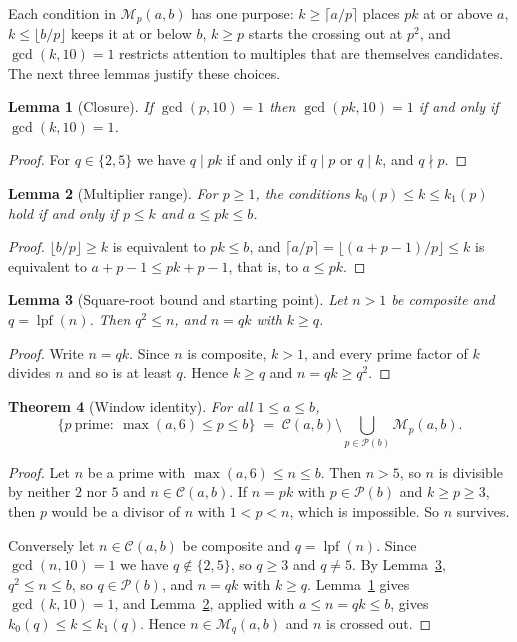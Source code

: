 \documentclass[11pt]{amsart}
\newtheorem{theorem}{Theorem}[section]
\newtheorem{lemma}[theorem]{Lemma}
\theoremstyle{definition}
\theoremstyle{remark}
\newcommand{\Cand}{\mathcal{C}}
\newcommand{\Sv}{\mathcal{P}}
\newcommand{\Mult}{\mathcal{M}}
\newcommand{\lpf}{\operatorname{lpf}}
\begin{document}
Each condition in $\Mult_p(a,b)$ has one purpose: $k\ge\lceil a/p\rceil$ places $pk$ at or above $a$, $k\le\lfloor b/p\rfloor$ keeps it at or below $b$, $k\ge p$ starts the crossing out at $p^2$, and $\gcd(k,10)=1$ restricts attention to multiples that are themselves candidates. The next three lemmas justify these choices.

\begin{lemma}[Closure]\label{lem:closure}
If $\gcd(p,10)=1$ then $\gcd(pk,10)=1$ if and only if $\gcd(k,10)=1$.
\end{lemma}

\begin{proof}
For $q\in\{2,5\}$ we have $q\mid pk$ if and only if $q\mid p$ or $q\mid k$, and $q\nmid p$.
\end{proof}

\begin{lemma}[Multiplier range]\label{lem:range}
For $p\ge 1$, the conditions $k_0(p)\le k\le k_1(p)$ hold if and only if $p\le k$ and $a\le pk\le b$.
\end{lemma}

\begin{proof}
$\lfloor b/p\rfloor\ge k$ is equivalent to $pk\le b$, and $\lceil a/p\rceil=\lfloor (a+p-1)/p\rfloor\le k$ is equivalent to $a+p-1\le pk+p-1$, that is, to $a\le pk$.
\end{proof}

\begin{lemma}[Square-root bound and starting point]\label{lem:sqrt}
Let $n>1$ be composite and $q=\lpf(n)$. Then $q^2\le n$, and $n=qk$ with $k\ge q$.
\end{lemma}

\begin{proof}
Write $n=qk$. Since $n$ is composite, $k>1$, and every prime factor of $k$ divides $n$ and so is at least $q$. Hence $k\ge q$ and $n=qk\ge q^2$.
\end{proof}

\begin{theorem}[Window identity]\label{thm:window}
For all $1\le a\le b$,
\[
\{p\ \text{prime}:\ \max(a,6)\le p\le b\}\;=\;\Cand(a,b)\setminus\bigcup_{p\in\Sv(b)}\Mult_p(a,b).
\]
\end{theorem}

\begin{proof}
Let $n$ be a prime with $\max(a,6)\le n\le b$. Then $n>5$, so $n$ is divisible by neither $2$ nor $5$ and $n\in\Cand(a,b)$. If $n=pk$ with $p\in\Sv(b)$ and $k\ge p\ge 3$, then $p$ would be a divisor of $n$ with $1<p<n$, which is impossible. So $n$ survives.

Conversely let $n\in\Cand(a,b)$ be composite and $q=\lpf(n)$. Since $\gcd(n,10)=1$ we have $q\notin\{2,5\}$, so $q\ge 3$ and $q\ne 5$. By Lemma~\ref{lem:sqrt}, $q^2\le n\le b$, so $q\in\Sv(b)$, and $n=qk$ with $k\ge q$. Lemma~\ref{lem:closure} gives $\gcd(k,10)=1$, and Lemma~\ref{lem:range}, applied with $a\le n=qk\le b$, gives $k_0(q)\le k\le k_1(q)$. Hence $n\in\Mult_q(a,b)$ and $n$ is crossed out.
\end{proof}
\end{document}
